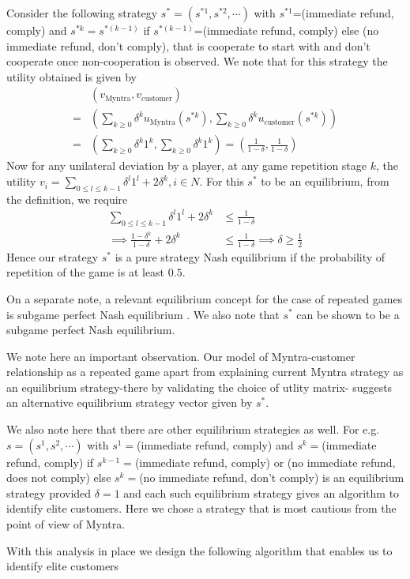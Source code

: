  Consider the following strategy $s^*=(s^{*1},s^{*2},\cdots)$ with $s^{*1}$=(immediate refund, comply) and $s^{*k}=s^{*(k-1)}$ if $s^{*(k-1)}$=(immediate refund, comply) else (no immediate refund, don't comply), that is cooperate to start with and don't cooperate once non-cooperation is observed. We note that for this strategy the utility obtained is given by
 \begin{align*}
  &(v_{\text{Myntra}},v_{\text{customer}}) \\
 =&\left(\displaystyle\sum_{k\geq0}\delta^{k} u_{\text{Myntra}}(s^{*k}),\displaystyle\sum_{k\geq0}\delta^{k} u_{\text{customer}}(s^{*k})\right) \\
 =&\left(\displaystyle\sum_{k\geq0}\delta^{k}1^k,\displaystyle\sum_{k\geq0}\delta^{k}1^k\right)
 =\left(\frac{1}{1-\delta},\frac{1}{1-\delta}\right)
 \end{align*}
 Now for any unilateral deviation by a player, at any game repetition stage $k$, the utility $v_{i}=\sum_{0\leq l\leq k-1}\delta^{l}1^l+2\delta^{k}, i\in N$. For this $s^*$ to be an equilibrium, from the definition, we require 
 \begin{align*}
    \displaystyle\sum_{0\leq l\leq k-1}\delta^{l}1^l+2\delta^{k} &\leq \frac{1}{1-\delta} \\
    \implies \frac{1-\delta^{k}}{1-\delta}+2\delta^{k} &\leq \frac{1}{1-\delta}
    \implies  \delta \geq \frac{1}{2}
 \end{align*}
 Hence our strategy $s^*$ is a pure strategy Nash equilibrium if the probability of repetition of the game is at least $0.5$.
 
 On a separate note, a relevant equilibrium concept for the case of repeated games is subgame perfect Nash equilibrium \cite{YN}. We also note that $s^*$ can be shown to be a subgame perfect Nash equilibrium. 
 
 We note here an important observation. Our model of Myntra-customer relationship as a repeated game apart from explaining current Myntra strategy as an equilibrium strategy-there by validating the choice of utlity matrix- suggests an alternative equilibrium strategy vector given by $s^*$. 
 
 We also note here that there are other equilibrium strategies as well. For e.g.
 $s=(s^1,s^2,\cdots)$ with $s^1=$(immediate refund, comply) and $s^{k}=$(immediate refund, comply) if $s^{k-1}=$(immediate refund, comply) or (no immediate refund, does not comply) else $s^{k}=$(no immediate refund, don't comply) is an equilibrium strategy provided $\delta=1$ and each such equilibrium strategy gives an algorithm to identify elite customers. Here we chose a strategy that is most cautious from the point of view of Myntra.
 
 
 With this analysis in place we design the following algorithm that enables us to identify elite customers
 